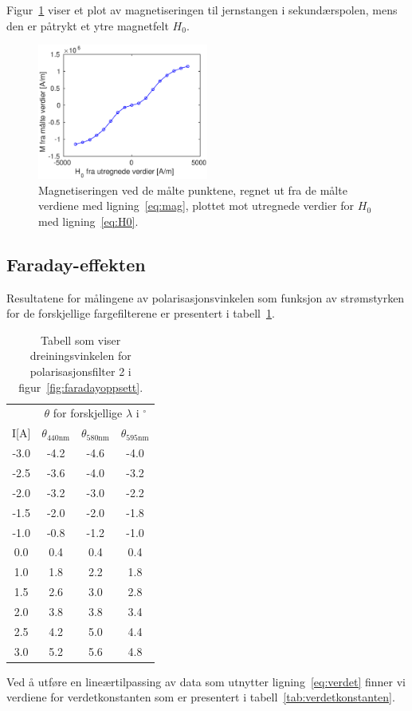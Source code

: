 \documentclass[a4paper,11pt, twocolumn]{article}
\begin{document}
Figur~\ref{fig:maksmag} viser et plot av magnetiseringen til jernstangen i sekundærspolen, mens den er påtrykt et ytre magnetfelt $H_0$. 
\begin{figure}[!ht]
	\centering
	\includegraphics[width=0.5\textwidth]{matlab/magnetisering.eps}
	\caption{Magnetiseringen ved de målte punktene, regnet ut fra de målte verdiene med ligning~\eqref{eq:mag}, plottet mot utregnede verdier for $H_0$ med ligning~\eqref{eq:H0}.}
	\label{fig:maksmag}
\end{figure}

\subsection{Faraday-effekten}
Resultatene for målingene av polarisasjonsvinkelen som funksjon av strømstyrken for de forskjellige fargefilterene er presentert i tabell~\ref{tab:verdet}.
\begin{table}
	\centering
	\caption{Tabell som viser dreiningsvinkelen for polarisasjonsfilter 2 i figur~\ref{fig:faradayoppsett}.}
	\begin{tabular}{cccc}
		\toprule
		\toprule
		& \multicolumn{3}{c}{$\theta$ for forskjellige $\lambda$ i $^\circ$} \\
		I[A] & $\theta_{440\text{nm}}$ & $\theta_{580\text{nm}}$ & $\theta_{595\text{nm}}$ \\
		\toprule
		-3.0 &	-4.2&	-4.6&	-4.0 \\
		-2.5&	-3.6&	-4.0&	-3.2 \\
		-2.0&	-3.2&	-3.0&	-2.2 \\
		-1.5&	-2.0&	-2.0&	-1.8 \\
		-1.0&	-0.8&	-1.2&	-1.0 \\
		0.0&	0.4&	0.4&	0.4 \\
		1.0&	1.8&	2.2&	1.8 \\
		1.5&	2.6&	3.0&	2.8 \\
		2.0&	3.8&	3.8&	3.4 \\
		2.5&	4.2&	5.0&	4.4 \\
		3.0&	5.2&	5.6&	4.8 \\
		\toprule
	\end{tabular}
	\label{tab:verdet}
\end{table}
Ved å utføre en lineærtilpassing av data som utnytter ligning~\eqref{eq:verdet} finner vi verdiene for verdetkonstanten som er presentert i tabell~\ref{tab:verdetkonstanten}. 
\end{document}
